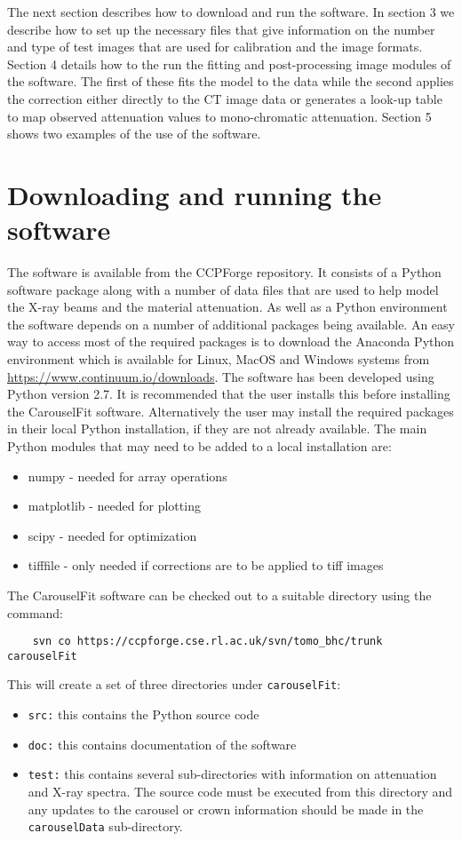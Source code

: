 \documentclass[a4paper,12pt]{article}
\begin{document}
The next section describes how to download and run the software.
In section 3 we describe how to set up the necessary files that give
information on the number and type of test images that are used for calibration and the
image formats.
Section 4 details how to the run the fitting and post-processing image modules of the software.
The first of these fits the model to the data while the second applies the correction either
directly to the CT image data or generates a look-up table to map observed attenuation values to
mono-chromatic attenuation.
Section 5 shows two examples of the use of the software.

\section{Downloading and running the software}

The software is available from the CCPForge repository.
It consists of a Python software package along with a number of data files that are used to help model the X-ray
beams and the material attenuation.
As well as a Python environment the software depends on a number of additional packages being available.
An easy way to access most of the required packages is to download the Anaconda Python environment which is
available for Linux, MacOS and Windows systems from \url{https://www.continuum.io/downloads}.
The software has been developed using Python version 2.7.
It is recommended that the user installs this before installing the CarouselFit software.
Alternatively the user may install the required packages in their local Python installation, if they are not
already available.
The main Python modules that may need to be added to a local installation are:
\begin{itemize}
\item numpy - needed for array operations
\item matplotlib - needed for plotting
\item scipy - needed for optimization
\item tifffile - only needed if corrections are to be applied to tiff images
\end{itemize}

The CarouselFit software can be checked out to a suitable directory using the command:
\begin{verbatim}
    svn co https://ccpforge.cse.rl.ac.uk/svn/tomo_bhc/trunk carouselFit
\end{verbatim}
This will create a set of three directories under \texttt{carouselFit}:
\begin{itemize}
\item \texttt{src:} this contains the Python source code
\item \texttt{doc:} this contains documentation of the software
\item \texttt{test:} this contains several sub-directories with information on attenuation and X-ray spectra.
The source code must be executed from this directory and any updates to the carousel or crown information
should be made in the \texttt{carouselData} sub-directory.
\end{itemize}
\end{document}

